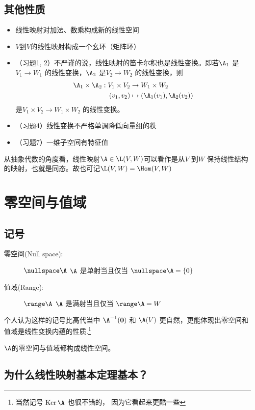 \subsection{其他性质}
\begin{itemize}
  \item 线性映射对加法、数乘构成新的线性空间
  \item \(V\)到\(V\)的线性映射构成一个幺环（矩阵环）
  \item （习题1, 2）不严谨的说，线性映射的笛卡尔积也是线性变换。即若\(\A_{1}\)
    是\(V_{1} \to W_{1}\) 的线性变换，\(\A_{2}\)
    是\(V_{2} \to W_{2}\) 的线性变换，则
    \begin{align*}
      \A_{1} \times \A_{2} : V_{1}
      \times V_{2} &\to W_{1} \times W_{2}\\
      (v_{1},v_{2}) &\mapsto
      (\A_{1}(v_{1}),\A_{2}(v_{2}))
    \end{align*}
    是\(V_{1} \times V_{2} \to
    W_{1} \times W_{2}\) 的线性变换。
  \item （习题4）线性变换不严格单调降低向量组的秩
  \item （习题7）一维子空间有特征值
\end{itemize}

从抽象代数的角度看，线性映射\(\A \in \L(V,W)\)可以看作是从\(V\) 到\(W\)
保持线性结构的映射，也就是同态。故也可记\(\L(V,W)=\Hom(V,W)\)

\section{零空间与值域}
\subsection{记号}
\begin{description}
  \item[零空间(Null space):] \(\nullspace \A\)
    \(\A\) 是单射当且仅当
    \(\nullspace \A = \{0\}\)
  \item[值域(Range):] \(\range \A\)
    \(\A\) 是满射当且仅当
    \(\range \A = W\)
\end{description}
个人认为这样的记号比高代当中 \(\A^{-1}(\mathbf{0})\) 和 \(\A(V)\)
更自然，更能体现出零空间和值域是线性变换内蕴的性质.\footnote{当然记号
  \(\operatorname{Ker} \A\) 也很不错的，
因为它看起来更酷一些 }

\(\A\)的零空间与值域都构成线性空间。

\subsection{为什么线性映射基本定理基本？}

